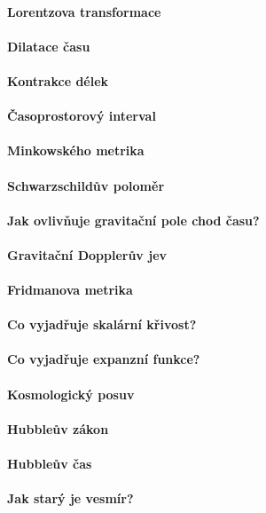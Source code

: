 \documentclass[11pt,a4paper,notitlepage]{article}
\begin{document}
\paragraph{Lorentzova transformace}
\paragraph{Dilatace času}
\paragraph{Kontrakce délek}
\paragraph{Časoprostorový interval}
\paragraph{Minkowského metrika}
\paragraph{Schwarzschildův poloměr}
\paragraph{Jak ovlivňuje gravitační pole chod času?}
\paragraph{Gravitační Dopplerův jev}
\paragraph{Fridmanova metrika}
\paragraph{Co vyjadřuje skalární křivost?}
\paragraph{Co vyjadřuje expanzní funkce?}
\paragraph{Kosmologický posuv}
\paragraph{Hubbleův zákon}
\paragraph{Hubbleův čas}
\paragraph{Jak starý je vesmír?}
\end{document}
